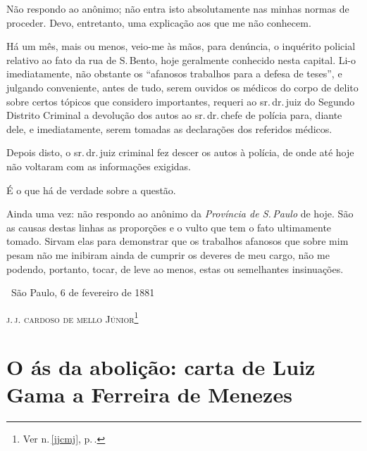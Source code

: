 Não respondo ao anônimo; não entra isto absolutamente nas minhas normas
de proceder. Devo, entretanto, uma explicação aos que me não conhecem.

Há um mês, mais ou menos, veio-me às mãos, para denúncia, o inquérito
policial relativo ao fato da rua de S.\,Bento, hoje geralmente conhecido
nesta capital. Li-o imediatamente, não obstante os ``afanosos trabalhos
para a defesa de teses'', e julgando conveniente, antes de tudo, serem
ouvidos os médicos do corpo de delito sobre certos tópicos que considero
importantes, requeri ao sr.\,dr.\,juiz do Segundo Distrito Criminal a
devolução dos autos ao sr.\,dr.\,chefe de polícia para, diante dele, e
imediatamente, serem tomadas as declarações dos referidos médicos.

Depois disto, o sr.\,dr.\,juiz criminal fez descer os autos à polícia, de
onde até hoje não voltaram com as informações exigidas.

É o que há de verdade sobre a questão.

Ainda uma vez: não respondo ao anônimo da \emph{Província de S.\,Paulo}
de hoje. São as causas destas linhas as proporções e o vulto
que tem o fato ultimamente tomado. Sirvam elas para demonstrar que os
trabalhos afanosos que sobre mim pesam não me inibiram ainda de cumprir
os deveres de meu cargo, não me podendo, portanto, tocar, de leve ao
menos, estas ou semelhantes insinuações.

\medskip
\hfill\ São Paulo, 6 de fevereiro de 1881

\hfill\textsc{j.\,j. cardoso de mello Júnior}\footnote{Ver n.\,\ref{jjcmj}, p.\,\pageref{jjcmj}.}

\part[O ás da abolição]{O ás da abolição: carta de Luiz Gama a Ferreira de Menezes}


